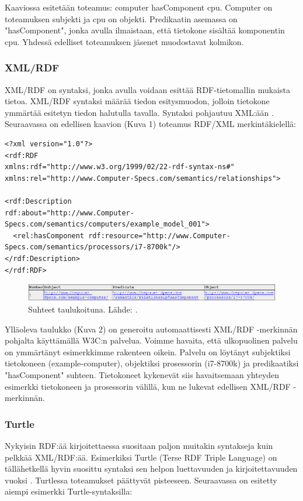 \documentclass[finnish, 12pt, a4paper, elec, utf8, pdfa, online]{aaltothesis}
\begin{document}
Kaaviossa esitetään toteamus: computer hasComponent cpu. Computer on toteamuksen subjekti ja cpu on objekti. Predikaatin asemassa on "hasComponent", jonka avulla ilmaistaan, että tietokone sisältää komponentin cpu. Yhdessä edelliset toteamuksen jäsenet muodostavat kolmikon.



\subsubsection{XML/RDF}
XML/RDF on syntaksi, jonka avulla voidaan esittää RDF-tietomallin mukaista tietoa. XML/RDF syntaksi määrää tiedon esitysmuodon, jolloin tietokone ymmärtää esitetyn tiedon halutulla tavalla. Syntaksi pohjautuu XML:ään \cite{RDF_XML}. Seuraavassa on edellisen kaavion (Kuva 1) toteamus RDF/XML merkintäkielellä:

\vskip 0.75cm
\begin{lstlisting}[style=codeblock]
<?xml version="1.0"?>
<rdf:RDF
xmlns:rdf="http://www.w3.org/1999/02/22-rdf-syntax-ns#"
xmlns:rel="http://www.Computer-Specs.com/semantics/relationships">

<rdf:Description
rdf:about="http://www.Computer-Specs.com/semantics/computers/example_model_001">
  <rel:hasComponent rdf:resource="http://www.Computer-Specs.com/semantics/processors/i7-8700k"/>
</rdf:Description>
</rdf:RDF>
\end{lstlisting}
\vskip 0.75cm


\begin{figure}[htb]
\centering
\includegraphics[width=15cm]{images/RDF-valid.PNG}
\caption{Suhteet taulukoituna. Lähde: \cite{W3C_RDF_validator}. \label{images/RDF-valid}}
\end{figure}

Ylläoleva taulukko (Kuva 2) on generoitu automaattisesti XML/RDF -merkinnän pohjalta käyttämällä W3C:n palvelua. Voimme havaita, että ulkopuolinen palvelu on ymmärtänyt esimerkkimme rakenteen oikein. Palvelu on löytänyt subjektiksi tietokoneen (example-computer), objektiksi prosessorin (i7-8700k) ja predikaatiksi "hasComponent" suhteen. Tietokoneet kykenevät siis havaitsemaan yhteyden esimerkki tietokoneen ja prosessorin välillä, kun ne lukevat edellisen XML/RDF -merkinnän.

\subsubsection{Turtle}
Nykyisin RDF:ää kirjoitettaessa suositaan paljon muitakin syntakseja kuin pelkkää XML/RDF:ää. Esimerkiksi Turtle (Terse RDF Triple Language) on tällähetkellä hyvin suosittu syntaksi sen helpon luettavuuden ja kirjoitettavuuden vuoksi \cite{cambridge2}. Turtlessa toteamukset päättyvät pisteeseen. Seuraavassa on esitetty aiempi esimerkki Turtle-syntaksilla:
\end{document}
